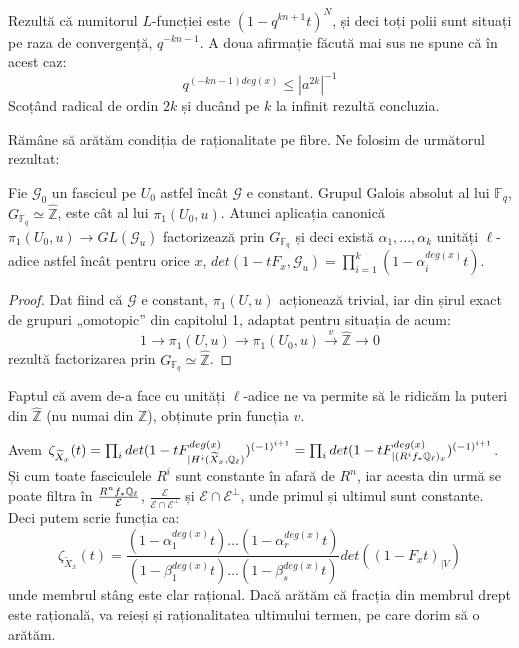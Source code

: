 \documentclass[13pt,openany,oneside]{book}
\begin{document}
Rezultă că numitorul $L$-funcției este $(1-q^{kn+1}t)^N$, și deci toți polii sunt situați pe raza de convergență, $q^{-kn-1}$. A doua afirmație făcută mai sus ne spune că în acest caz:
$$q^{(-kn-1)deg(x)}\leq|a^{2k}|^{-1}$$
Scoțând radical de ordin $2k$ și ducând pe $k$ la infinit rezultă concluzia.

Rămâne să arătăm condiția de raționalitate pe fibre. Ne folosim de următorul rezultat:

\begin{lema}
Fie $\mathcal{G}_0$ un fascicul pe $U_0$ astfel încât $\mathcal{G}$ e constant. Grupul Galois absolut al lui $\mathbb{F}_q$, $G_{\mathbb{F}_q}\simeq\hat{\mathbb{Z}}$, este cât al lui $\pi_1(U_0,u)$. Atunci aplicația canonică $\pi_1(U_0,u) \rightarrow GL(\mathcal{G}_u)$ factorizează prin $G_{\mathbb{F}_q}$ și deci există $\alpha_1,...,\alpha_k$ unități $\ell$-adice astfel încât pentru orice $x$, $det(1-tF_x, \mathcal{G}_u)=\prod_{i=1}^k (1-\alpha_i^{deg(x)}t)$.
\end{lema}

\begin{proof}
Dat fiind că $\mathcal{G}$ e constant, $\pi_1(U,u)$ acționează trivial, iar din șirul exact de grupuri „omotopic” din capitolul 1, adaptat pentru situația de acum:
$$1 \to \pi_1(U,u) \to \pi_1(U_0,u) \xrightarrow{v} \hat{\mathbb{Z}} \to 0$$
rezultă factorizarea prin $G_{\mathbb{F}_q}\simeq\hat{\mathbb{Z}}$.
\end{proof}

Faptul că avem de-a face cu unități $\ell$-adice ne va permite să le ridicăm la puteri din $\hat{\mathbb{Z}}$ (nu numai din $\mathbb{Z}$), obținute prin funcția $v$.

Avem $\zeta_{\widetilde{X}_x}(t)=\prod_i det(1-tF^{deg(x)}_{\mid H^i(\widetilde{X}_x,\mathbb{Q}_\ell)})^{(-1)^{i+1}}=\prod_i det(1-tF^{deg(x)}_{\mid (R^i f_* \mathbb{Q}_\ell)_x})^{(-1)^{i+1}}$. Și cum toate fasciculele $R^i$ sunt constante în afară de $R^n$, iar acesta din urmă se poate filtra în $\frac{R^n f_* \mathbb{Q}_\ell}{\mathcal{E}}$, $\frac{\mathcal{E}}{\mathcal{E} \cap \mathcal{E}^\perp}$ și $\mathcal{E} \cap \mathcal{E}^\perp$, unde primul și ultimul sunt constante. Deci putem scrie funcția ca:
$$\zeta_{\widetilde{X}_x}(t)=\frac{(1-\alpha_1^{deg(x)}t)...(1-\alpha_r^{deg(x)}t)}{(1-\beta_1^{deg(x)}t)...(1-\beta_s^{deg(x)}t)}det((1-F_xt)_{\mid V})$$
unde membrul stâng este clar rațional. Dacă arătăm că fracția din membrul drept este rațională, va reieși și raționalitatea ultimului termen, pe care dorim să o arătăm.
\end{document}
